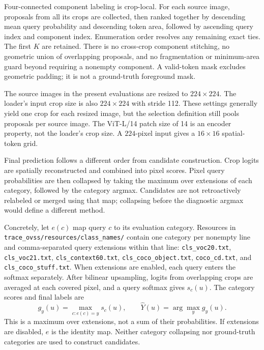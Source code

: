 Four-connected component labeling is crop-local. For each source image, proposals from all its crops are collected, then ranked together by descending mean query probability and descending token area, followed by ascending query index and component index. Enumeration order resolves any remaining exact ties. The first $K$ are retained. There is no cross-crop component stitching, no geometric union of overlapping proposals, and no fragmentation or minimum-area guard beyond requiring a nonempty component. A valid-token mask excludes geometric padding; it is not a ground-truth foreground mask.

The source images in the present evaluations are resized to $224\times224$. The loader's input crop size is also $224\times224$ with stride 112. These settings generally yield one crop for each resized image, but the selection definition still pools proposals per source image. The ViT-L/14 patch size of 14 is an encoder property, not the loader's crop size. A $224$-pixel input gives a $16\times16$ spatial-token grid.

Final prediction follows a different order from candidate construction. Crop logits are spatially reconstructed and combined into pixel scores. Pixel query probabilities are then collapsed by taking the maximum over extensions of each category, followed by the category argmax. Candidates are not retroactively relabeled or merged using that map; collapsing before the diagnostic argmax would define a different method.

Concretely, let $e(c)$ map query $c$ to its evaluation category. Resources in \texttt{trace\_ovss/resources/class\_names/} contain one category per nonempty line and comma-separated query extensions within that line: \texttt{cls\_voc20.txt}, \texttt{cls\_voc21.txt}, \texttt{cls\_context60.txt}, \texttt{cls\_coco\_object.txt}, \texttt{coco\_cd.txt}, and \texttt{cls\_coco\_stuff.txt}. When extensions are enabled, each query enters the softmax separately. After bilinear upsampling, logits from overlapping crops are averaged at each covered pixel, and a query softmax gives $s_c(u)$. The category scores and final labels are
\begin{equation}
g_y(u)=\max_{c:e(c)=y}s_c(u),\qquad
\widehat Y(u)=\arg\max_y g_y(u).
\end{equation}
This is a maximum over extensions, not a sum of their probabilities. If extensions are disabled, $e$ is the identity map. Neither category collapsing nor ground-truth categories are used to construct candidates.

